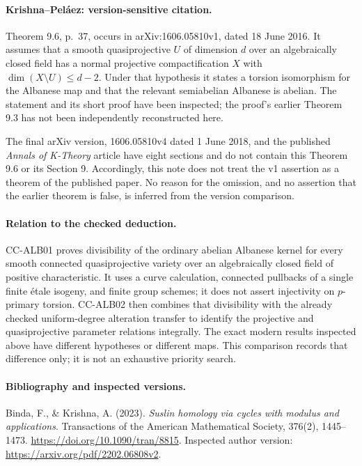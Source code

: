 \documentclass[11pt,a4paper]{article}
\theoremstyle{definition}\newtheorem{definition}[theorem]{Definition}
\theoremstyle{remark}\newtheorem{remark}[theorem]{Remark}
\begin{document}
\paragraph{Krishna--Pel\'aez: version-sensitive citation.}
Theorem 9.6, p.~37, occurs in arXiv:1606.05810v1, dated 18 June 2016.
It assumes that a smooth quasiprojective \(U\) of dimension \(d\) over
an algebraically closed field has a normal projective compactification
\(X\) with \(\dim(X\setminus U)\le d-2\). Under that hypothesis it
states a torsion isomorphism for the Albanese map and that the relevant
semiabelian Albanese is abelian. The statement and its short proof
have been inspected; the proof's earlier Theorem 9.3 has not been
independently reconstructed here.

The final arXiv version, 1606.05810v4 dated 1 June 2018, and the
published \emph{Annals of K-Theory} article have eight sections and do
not contain this Theorem 9.6 or its Section 9. Accordingly, this note
does not treat the v1 assertion as a theorem of the published paper.
No reason for the omission, and no assertion that the earlier theorem
is false, is inferred from the version comparison.

\paragraph{Relation to the checked deduction.}
CC-ALB01 proves divisibility of the ordinary abelian Albanese kernel
for every smooth connected quasiprojective variety over an
algebraically closed field of positive characteristic. It uses a
curve calculation, connected pullbacks of a single finite \'etale
isogeny, and finite group schemes; it does not assert injectivity on
\(p\)-primary torsion. CC-ALB02 then combines that divisibility with
the already checked uniform-degree alteration transfer to identify
the projective and quasiprojective parameter relations integrally.
The exact modern results inspected above have different hypotheses
or different maps. This comparison records that difference only;
it is not an exhaustive priority search.

\paragraph{Bibliography and inspected versions.}
Binda, F., \& Krishna, A. (2023).
\emph{Suslin homology via cycles with modulus and applications}.
Transactions of the American Mathematical Society, 376(2), 1445--1473.
\url{https://doi.org/10.1090/tran/8815}.
Inspected author version:
\url{https://arxiv.org/pdf/2202.06808v2}.
\end{document}
